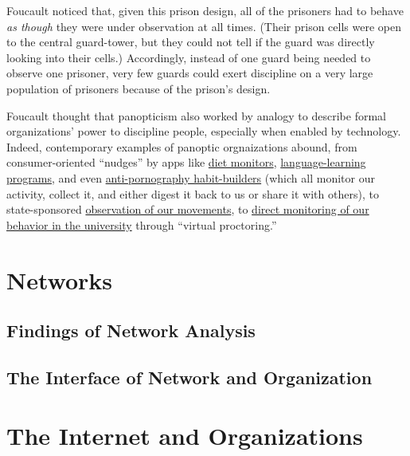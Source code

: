 \documentclass[
  letterpaper,
  DIV=11,
  numbers=noendperiod,
  oneside]{scrartcl}
\begin{document}
Foucault noticed that, given this prison design, all of the prisoners
had to behave \emph{as though} they were under observation at all times.
(Their prison cells were open to the central guard-tower, but they could
not tell if the guard was directly looking into their cells.)
Accordingly, instead of one guard being needed to observe one prisoner,
very few guards could exert discipline on a very large population of
prisoners because of the prison's design.

Foucault thought that panopticism also worked by analogy to describe
formal organizations' power to discipline people, especially when
enabled by technology. Indeed, contemporary examples of panoptic
orgnaizations abound, from consumer-oriented ``nudges'' by apps like
\href{https://www.weightwatchers.com/us/blog/introducing-new-weight-watchers}{diet
monitors},
\href{https://www.reddit.com/r/duolingo/comments/1c2gkt6/sad_duolingo_icon_mega_thread/}{language-learning
programs}, and even
\href{https://www.covenanteyes.com/about/?gad_source=1&gad_campaignid=407188357&gclid=CjwKCAjwxeHWBhBPEiwAiqtQ-aMtPL_Vfnj_ODa3GomXjKMG3YhIVtROQqqOkd4YNbcvgFrxEH8bThoCoKkQAvD_BwE}{anti-pornography
habit-builders} (which all monitor our activity, collect it, and either
digest it back to us or share it with others), to state-sponsored
\href{https://www.flocksafety.com/products/license-plate-readers}{observation
of our movements}, to
\href{https://it.stonybrook.edu/services/respondus}{direct monitoring of
our behavior in the university} through ``virtual proctoring.''

\section{Networks}\label{networks}

\subsection{Findings of Network
Analysis}\label{findings-of-network-analysis}

\subsection{The Interface of Network and
Organization}\label{the-interface-of-network-and-organization}

\section{The Internet and
Organizations}\label{the-internet-and-organizations}
\end{document}
